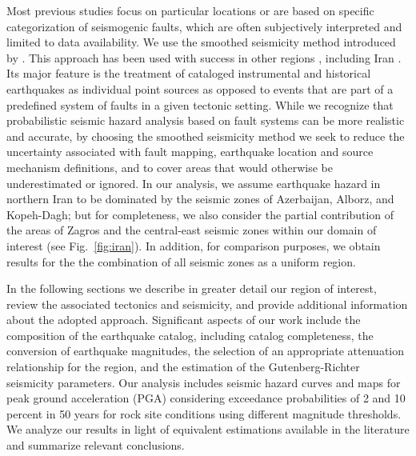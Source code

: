 Most previous studies focus on particular locations or are based on specific categorization of seismogenic faults, which are often subjectively interpreted and limited to data availability. We use the smoothed seismicity method introduced by \citet{Frankel1995}. This approach has been used with success in other regions \citep[e.g.][]{Cao1996, Akinci2004, Kalkan2009}, including Iran \citep{Khodaverdian_2016_BSSA}. Its major feature is the treatment of cataloged instrumental and historical earthquakes as individual point sources as opposed to events that are part of a predefined system of faults in a given tectonic setting. While we recognize that probabilistic seismic hazard analysis based on fault systems can be more realistic and accurate, by choosing the smoothed seismicity method we seek to reduce the uncertainty associated with fault mapping, earthquake location and source mechanism definitions, and to cover areas that would otherwise be underestimated or ignored. In our analysis, we assume earthquake hazard in northern Iran to be dominated by the seismic zones of Azerbaijan, Alborz, and Kopeh-Dagh; but for completeness, we also consider the partial contribution of the areas of Zagros and the central-east seismic zones within our domain of interest (see Fig.~\ref{fig:iran}). In addition, for comparison purposes, we obtain results for the the combination of all seismic zones as a uniform region.

In the following sections we describe in greater detail our region of interest, review the associated tectonics and seismicity, and provide additional information about the adopted approach. Significant aspects of our work include the composition of the earthquake catalog, including catalog completeness, the conversion of earthquake magnitudes, the selection of an appropriate attenuation relationship for the region, and the estimation of the Gutenberg-Richter seismicity parameters. Our analysis includes seismic hazard curves and maps for peak ground acceleration (PGA) considering exceedance probabilities of 2 and 10 percent in 50 years for rock site conditions using different magnitude thresholds. We analyze our results in light of equivalent estimations available in the literature and summarize relevant conclusions.




